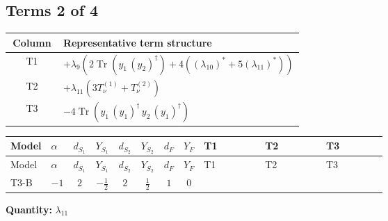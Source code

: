 \documentclass[8pt]{article}
\begin{document}
\begin{landscape}
\subsection*{Terms 2 of 4}
\begin{center}
\begin{tabular}{@{}c >{\raggedright\arraybackslash}p{0.82\linewidth}@{}}
\toprule
Column & Representative term structure \\
\midrule
T1 & \(\displaystyle +{\lambda_{9}} (2 \operatorname{Tr}\!\left({y_1}\,\left({y_2}\right)^{\dagger}\right)+4 (\left({\lambda_{10}}\right)^{*}+5 \left({\lambda_{11}}\right)^{*}))\) \\
\midrule
T2 & \(\displaystyle +{\lambda_{11}} (3 T_{\nu}^{(1)}+T_{\nu}^{(2)})\) \\
\midrule
T3 & \(\displaystyle -4 \operatorname{Tr}\!\left({y_1}\,\left({y_1}\right)^{\dagger}\,{y_2}\,\left({y_1}\right)^{\dagger}\right)\) \\
\midrule
\bottomrule
\end{tabular}
\end{center}
\smallskip
\tiny
\begin{longtable}{@{}llcccccc >{\raggedright\arraybackslash}p{0.21\linewidth} >{\raggedright\arraybackslash}p{0.21\linewidth} >{\raggedright\arraybackslash}p{0.21\linewidth}@{}}
\toprule
Model & $\alpha$ & $d_{S_1}$ & $Y_{S_1}$ & $d_{S_2}$ & $Y_{S_2}$ & $d_F$ & $Y_F$ & T1 & T2 & T3 \\
\midrule
\endfirsthead
\toprule
Model & $\alpha$ & $d_{S_1}$ & $Y_{S_1}$ & $d_{S_2}$ & $Y_{S_2}$ & $d_F$ & $Y_F$ & T1 & T2 & T3 \\
\midrule
\endhead
T3-B & $-1$ & $2$ & $-\frac{1}{2}$ & $2$ & $\frac{1}{2}$ & $1$ & $0$ & \scriptsize\adjustbox{max width=\linewidth}{$\begin{gathered} +{\lambda_{9}} (2 \operatorname{Tr}\!\left({y_1}\,\left({y_2}\right)^{\dagger}\right)+4 (\left({\lambda_{10}}\right)^{*}+5 \left({\lambda_{11}}\right)^{*}))\end{gathered}$} & \scriptsize\adjustbox{max width=\linewidth}{$\begin{gathered} +{\lambda_{11}} (3 T_{\nu}^{(1)}+T_{\nu}^{(2)})\end{gathered}$} & \scriptsize\adjustbox{max width=\linewidth}{$\begin{gathered} -4 \operatorname{Tr}\!\left({y_1}\,\left({y_1}\right)^{\dagger}\,{y_2}\,\left({y_1}\right)^{\dagger}\right)\end{gathered}$} \\
\midrule
\bottomrule
\end{longtable}
\clearpage
\noindent\textbf{Quantity: }$\lambda_{11}$\par\smallskip

\end{landscape}
\end{document}
